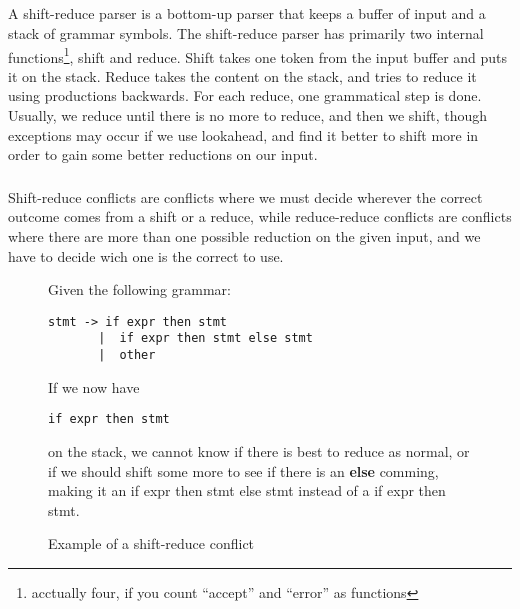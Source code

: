 \documentclass{article}
\begin{document}
\subsection{}
\subsubsection{}
A shift-reduce parser is a bottom-up parser that keeps a buffer of input and a
stack of grammar symbols. The shift-reduce parser has primarily two internal
functions\footnote{acctually four, if you count ``accept'' and ``error'' as
functions}, shift and reduce. Shift takes one token from the input buffer and
puts it on the stack.
Reduce takes the content on the stack, and tries to reduce it using productions
backwards. For each reduce, one grammatical step is done. Usually, we reduce
until there is no more to reduce, and then we shift, though exceptions may occur
if we use lookahead, and find it better to shift more in order to gain
some better reductions on our input.

\subsubsection{}
Shift-reduce conflicts are conflicts where we must decide wherever the correct
outcome comes from a shift or a reduce, while reduce-reduce conflicts are
conflicts where there are more than one possible reduction on the given input,
and we have to decide wich one is the correct to use.

\begin{figure}[h]
\caption{Example of a shift-reduce conflict}
Given the following grammar:
\begin{lstlisting}
stmt -> if expr then stmt
	   |  if expr then stmt else stmt
	   |  other
\end{lstlisting}
If we now have
\begin{lstlisting}
if expr then stmt
\end{lstlisting}

on the stack, we cannot know if there is best to
reduce as normal, or if we should shift some more to see if there is an \textbf{else} comming, making it an
{\ttfamily if expr then stmt else stmt} instead of a {\ttfamily if expr then
stmt}.
\end{figure}
\end{document}
